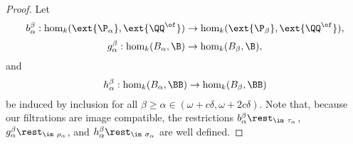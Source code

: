 \begin{proof}

  Let
  \[ b_\alpha^\beta : \hom_k(\ext{\P_\alpha},\ext{\QQ^\of})\to \hom_k(\ext{\P_\beta}, \ext{\QQ^\of}),\]
  \[ g_\alpha^\beta : \hom_k(B_\alpha,\B)\to\hom_k(B_\beta, \B),\]
  and
  \[ h_\alpha^\beta : \hom_k(B_\alpha,\BB)\to\hom_k(B_\beta, \BB)\]
  be induced by inclusion for all $\beta\geq\alpha\in (\omega+c\delta, \omega+2c\delta)$.
  Note that, because our filtrations are image compatible, the restrictions $b_\alpha^\beta\rest_{\im~\tau_\alpha}$, $g_\alpha^\beta\rest_{\im~\rho_\alpha}$, and $h_\alpha^\beta\rest_{\im~\sigma_\alpha}$ are well defined.



\end{proof}
